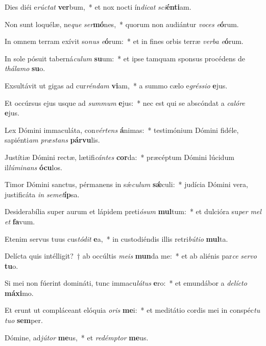 \item Dies diéi e\textit{rúc}\textit{tat} \textbf{ver}bum,~* et nox nocti ín\textit{di}\textit{cat} \textit{sci}\textbf{én}\textbf{ti}am.
\item Non sunt loquélæ, ne\textit{que} \textit{ser}\textbf{mó}nes,~* quorum non audiántur \textit{vo}\textit{ces} \textit{e}\textbf{ó}rum.
\item In omnem terram exívit so\textit{nus} \textit{e}\textbf{ó}rum:~* et in fines orbis terræ \textit{ver}\textit{ba} \textit{e}\textbf{ó}rum.
\item In sole pósuit taberná\textit{cu}\textit{lum} \textbf{su}um:~* et ipse tamquam sponsus procédens de \textit{thá}\textit{la}\textit{mo} \textbf{su}o.
\item Exsultávit ut gigas ad cur\textit{rén}\textit{dam} \textbf{vi}am,~* a summo cælo e\textit{grés}\textit{si}\textit{o} \textbf{e}jus.
\item Et occúrsus ejus usque ad \textit{sum}\textit{mum} \textbf{e}jus:~* nec est qui se abscóndat a \textit{ca}\textit{ló}\textit{re} \textbf{e}jus.
\item Lex Dómini immaculáta, con\textit{vér}\textit{tens} \textbf{á}nimas:~* testimónium Dómini fidéle, sapiénti\textit{am} \textit{præ}\textit{stans} \textbf{pár}\textbf{vu}lis.
\item Justítiæ Dómini rectæ, lætifi\textit{cán}\textit{tes} \textbf{cor}da:~* præcéptum Dómini lúcidum il\textit{lú}\textit{mi}\textit{nans} \textbf{ó}\textbf{cu}los.
\item Timor Dómini sanctus, pérmanens in sǽ\textit{cu}\textit{lum} \textbf{sǽ}culi:~* judícia Dómini vera, justificáta \textit{in} \textit{se}\textit{met}\textbf{íp}sa.
\item Desiderabília super aurum et lápidem preti\textit{ó}\textit{sum} \textbf{mul}tum:~* et dulcióra su\textit{per} \textit{mel} \textit{et} \textbf{fa}vum.
\item Etenim servus tuus cus\textit{tó}\textit{dit} \textbf{e}a,~* in custodiéndis illis retri\textit{bú}\textit{ti}\textit{o} \textbf{mul}ta.
\item Delícta quis intélligit?~† ab occúltis \textit{me}\textit{is} \textbf{mun}da me:~* et ab aliénis par\textit{ce} \textit{ser}\textit{vo} \textbf{tu}o.
\item Si mei non fúerint domináti, tunc immacu\textit{lá}\textit{tus} \textbf{e}ro:~* et emundábor a \textit{de}\textit{líc}\textit{to} \textbf{má}\textbf{xi}mo.
\item Et erunt ut compláceant elóquia \textit{o}\textit{ris} \textbf{me}i:~* et meditátio cordis mei in conspéc\textit{tu} \textit{tu}\textit{o} \textbf{sem}per.
\item Dómine, ad\textit{jú}\textit{tor} \textbf{me}us,~* et \textit{red}\textit{émp}\textit{tor} \textbf{me}us.
